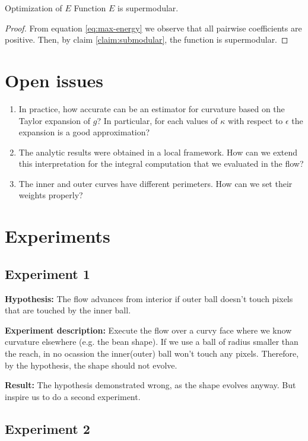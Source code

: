 \begin{claim}{Optimization of $E$}
	Function $E$ is supermodular.
\end{claim}

\begin{proof}
	From equation \eqref{eq:max-energy} we observe that all pairwise coefficients are positive. Then, by claim \ref{claim:submodular}, the function is supermodular.
\end{proof}


\section{Open issues}

\begin{enumerate}
	\item{In practice, how accurate can be an estimator for curvature based on the Taylor expansion of $g$? In particular, for each values of $\kappa$ with respect to $\epsilon$ the expansion is a good approximation?}
	\item{The analytic results were obtained in a local framework. How can we extend this interpretation for the integral computation that we evaluated in the flow?}
	\item{The inner and outer curves have different perimeters. How can we set their weights properly?}
\end{enumerate}


\section{Experiments}

\subsection{Experiment 1}
\textbf{Hypothesis:} The flow advances from interior if outer ball doesn't touch pixels that are touched by the inner ball.


\textbf{Experiment description:} Execute the flow over a curvy face where we know curvature elsewhere (e.g. the bean shape). If we use a ball of radius smaller than the reach, in no ocassion the inner(outer) ball won't touch any pixels. Therefore, by the hypothesis, the shape should not evolve.


\textbf{Result:} The hypothesis demonstrated wrong, as the shape evolves anyway. But inspire us to do a second experiment.

\subsection{Experiment 2}


